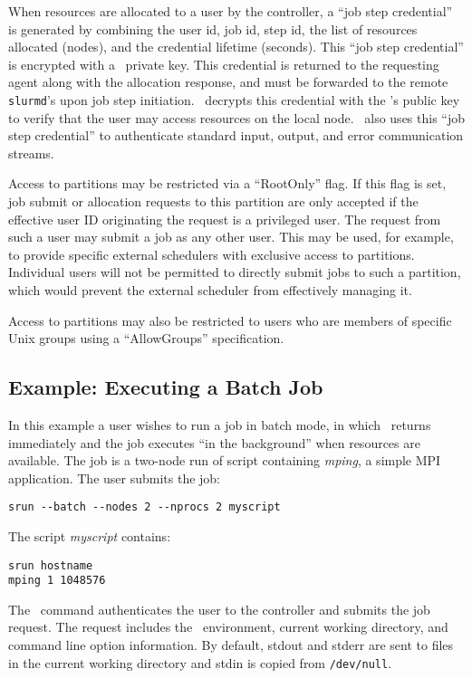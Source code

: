 When resources are allocated to a user by the controller, a ``job 
step credential'' is generated by combining the user id, job id, 
step id, the list of resources allocated (nodes), and the credential
lifetime (seconds). This ``job step credential'' is encrypted with 
a \slurmctld\ private key. 
This credential is returned to the requesting agent along with the
allocation response, and must be forwarded to the remote {\tt slurmd}'s 
upon job step initiation. \slurmd\ decrypts this credential with the
\slurmctld 's public key to verify that the user may access
resources on the local node. \slurmd\ also uses this ``job step credential'' 
to authenticate standard input, output, and error communication streams. 

Access to partitions may be restricted via a ``RootOnly'' flag.  
If this flag is set, job submit or allocation requests to this 
partition are only accepted if the effective user ID originating 
the request is a privileged user. 
The request from such a user may submit a job as any other user. 
This may be used, for example, to provide specific external schedulers
with exclusive access to partitions.  Individual users will not be 
permitted to directly submit jobs to such a partition, which would 
prevent the external scheduler from effectively managing it.  

Access to partitions may also be restricted to users who are 
members of specific Unix groups using a ``AllowGroups'' specification.

\subsection{Example:  Executing a Batch Job}

In this example a user wishes to run a job in batch mode, in which \srun\ returns 
immediately and the job executes ``in the background'' when resources
are available.
The job is a two-node run of script containing {\em mping}, a simple MPI application.
The user submits the job:
\begin{verbatim}
srun --batch --nodes 2 --nprocs 2 myscript
\end{verbatim}
The script {\em myscript} contains:
\begin{verbatim}
srun hostname
mping 1 1048576
\end{verbatim}

The \srun\ command authenticates the user to the controller and submits
the job request. 
The request includes the \srun\ environment, current working directory, 
and command line option information. By default, stdout and stderr are
sent to files in the current working directory and stdin is copied from
{\tt /dev/null}.

